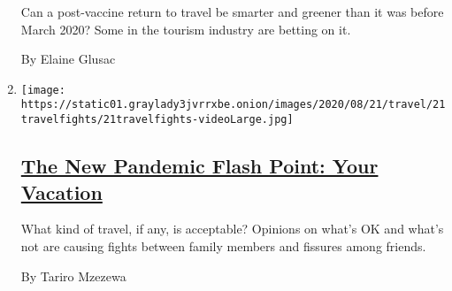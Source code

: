 \begin{enumerate}
  Can a post-vaccine return to travel be smarter and greener than it was
  before March 2020? Some in the tourism industry are betting on it.

  By Elaine Glusac
\item
  \texttt{[image: https://static01.graylady3jvrrxbe.onion/images/2020/08/21/travel/21travelfights/21travelfights-videoLarge.jpg]}

  \hypertarget{the-new-pandemic-flash-point-your-vacation}{%
  \subsection{\texorpdfstring{\href{/2020/08/25/travel/vacation-travel-coronavirus.html}{The
  New Pandemic Flash Point: Your
  Vacation}}{The New Pandemic Flash Point: Your Vacation}}\label{the-new-pandemic-flash-point-your-vacation}}

  What kind of travel, if any, is acceptable? Opinions on what's OK and
  what's not are causing fights between family members and fissures
  among friends.

  By Tariro Mzezewa
\end{enumerate}

